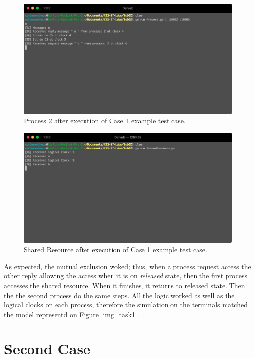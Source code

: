 \documentclass[a4paper, 11pt]{article}
\begin{document}
\begin{figure}[h]
  \begin{center}
  \includegraphics[width=4.5in]{./imgs/case1process1.png}
  \caption{Process 2 after execution of Case 1 example test case.}
  \label{img_task1_example_window2}
  \end{center}
\end{figure}

\begin{figure}[h]
  \begin{center}
  \includegraphics[width=4.5in]{./imgs/case1CS.png}
  \caption{Shared Resource after execution of Case 1 example test case.}
  \label{img_task1_example_window3}
  \end{center}
\end{figure}

As expected, the mutual exclusion woked; thus, when a process request access the other reply allowing the access when it is on \textit{released} state, then the first process accesses the shared resource. When it finishes, it returns to released state. Then the the second process do the same steps. All the logic worked as well as the logical clocks on each process, therefore the simulation on the terminals matched the model representd on Figure \ref{img_task1}.

\section*{Second Case}
\end{document}
